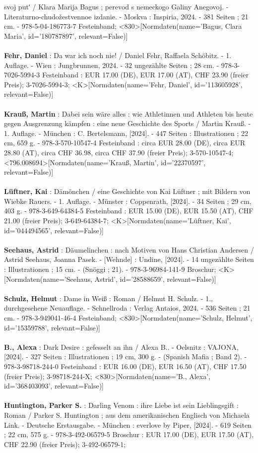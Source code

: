 \documentclass{article}
\begin{document}
\begin{multicols}{3}
svoj putʹ / Klara Marija Bagus ; perevod s nemeckogo Galiny Anegovoj. - Literaturno-chudožestvennoe izdanie. - Moskva : Inspiria, 2024. - 381 Seiten ; 21 cm. - 978-5-04-186773-7 Festeinband; <830>[Normdaten(name='Bagus, Clara Maria', id='180787897', relevant=False)]\\\\\textbf{Fehr, Daniel} : Da war ich noch nie! / Daniel Fehr, Raffaela Schöbitz. - 1. Auflage. - Wien : Jungbrunnen, 2024. - 32 ungezählte Seiten ; 28 cm. - 978-3-7026-5994-3 Festeinband : EUR 17.00 (DE), EUR 17.00 (AT), CHF 23.90 (freier Preis); 3-7026-5994-3; <K>[Normdaten(name='Fehr, Daniel', id='113605928', relevant=False)]\\\\\textbf{Krauß, Martin} : Dabei sein wäre alles : wie Athletinnen und Athleten bis heute gegen Ausgrenzung kämpfen : eine neue Geschichte des Sports / Martin Krauß. - 1. Auflage. - München : C. Bertelsmann, [2024]. - 447 Seiten : Illustrationen ; 22 cm, 659 g. - 978-3-570-10547-4 Festeinband : circa EUR 28.00 (DE), circa EUR 28.80 (AT), circa CHF 36.98, circa CHF 37.90 (freier Preis); 3-570-10547-4; <796.008694>[Normdaten(name='Krauß, Martin', id='22370597', relevant=False)]\\\\\textbf{Lüftner, Kai} : Dämönchen / eine Geschichte von Kai Lüftner ; mit Bildern von Wiebke Rauers. - 1. Auflage. - Münster : Coppenrath, [2024]. - 34 Seiten ; 29 cm, 403 g. - 978-3-649-64384-5 Festeinband : EUR 15.00 (DE), EUR 15.50 (AT), CHF 21.00 (freier Preis); 3-649-64384-7; <K>[Normdaten(name='Lüftner, Kai', id='044494565', relevant=False)]\\\\\textbf{Seehaus, Astrid} : Däumelinchen : nach Motiven von Hans Christian Andersen / Astrid Seehaus, Joanna Pasek. - [Wehnde] : Undine, [2024]. - 14 ungezählte Seiten : Illustrationen ; 15 cm. - (Snöggi ; 21). - 978-3-96984-141-9 Broschur; <K>[Normdaten(name='Seehaus, Astrid', id='28588659', relevant=False)]\\\\\textbf{Schulz, Helmut} : Dame in Weiß : Roman / Helmut H. Schulz. - 1., durchgesehene Neuauflage. - Schnellroda : Verlag Antaios, 2024. - 536 Seiten ; 21 cm. - 978-3-949041-46-4 Festeinband; <830>[Normdaten(name='Schulz, Helmut', id='15359788', relevant=False)]\\\\\textbf{B., Alexa} : Dark Desire : gefesselt an ihn / Alexa B.. - Oelsnitz : VAJONA, [2024]. - 327 Seiten : Illustrationen ; 19 cm, 300 g. - (Spanish Mafia ; Band 2). - 978-3-98718-244-0 Festeinband : EUR 16.00 (DE), EUR 16.50 (AT), CHF 17.50 (freier Preis); 3-98718-244-X; <830>[Normdaten(name='B., Alexa', id='368403093', relevant=False)]\\\\\textbf{Huntington, Parker S.} : Darling Venom : ihre Liebe ist sein Lieblingsgift : Roman / Parker S. Huntington ; aus dem amerikanischen Englisch von Michaela Link. - Deutsche Erstausgabe. - München : everlove by Piper, [2024]. - 619 Seiten ; 22 cm, 575 g. - 978-3-492-06579-5 Broschur : EUR 17.00 (DE), EUR 17.50 (AT), CHF 22.90 (freier Preis); 3-492-06579-1; 
\end{multicols}
\end{document}
